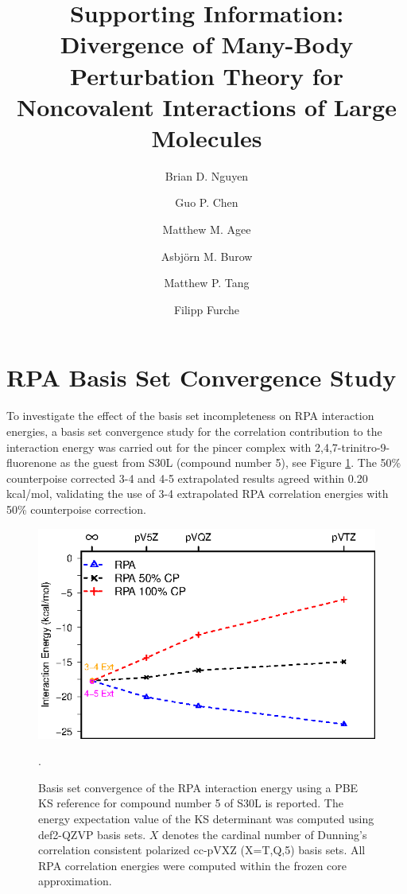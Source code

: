 \documentclass[journal=jctcce,manuscript=article]{achemso}
\author{Brian D. Nguyen}
\author{Guo P. Chen}
\author{Matthew M. Agee}
\author{Asbj{\"o}rn M. Burow}
\author{Matthew P. Tang}
\author{Filipp Furche}
\affiliation{Department of Chemistry, University of California, Irvine,
    1102 Natural Sciences II, Irvine, CA 92697-2025, USA}
\title{Supporting Information: Divergence of Many-Body Perturbation Theory
  for Noncovalent Interactions of Large Molecules}
\newcommand{\filipp}[1]{{\color{red} #1}}
\begin{document}
\maketitle

\tableofcontents
\newpage

\section{RPA Basis Set Convergence Study}

To investigate the effect of the basis set incompleteness on RPA interaction
energies, a basis set convergence study for the correlation contribution
to the interaction energy was carried out for the
pincer complex with 2,4,7-trinitro-9-fluorenone as the guest from
S30L (compound number 5)\cite{Sure15JChemTheoryComput}, see
Figure \ref{fig:extrapol}. The 50\% counterpoise corrected 3-4 and 4-5
extrapolated results agreed within 0.20 kcal/mol, validating the
use of 3-4 extrapolated RPA correlation energies with 50\% counterpoise
correction.

\begin{figure}[H]
  \centering
  \includegraphics{extrapol.eps}
  \caption{Basis set convergence of the RPA interaction energy using a
    PBE KS reference for compound number 5 of S30L\cite{Sure15JChemTheoryComput}
    is reported. The energy expectation value of the KS determinant was computed
    using def2-QZVP\cite{Weigend03JChemPhys119p12753} 
    basis sets. $X$ denotes the cardinal number of Dunning's correlation
    consistent polarized cc-pVXZ (X=T,Q,5) basis
    sets\cite{Dunning89JChemPhys90p1007,doi:10.1063/1.464303}. All RPA
    correlation energies were computed within the frozen core
    approximation.
     } \label{fig:extrapol}. 
\end{figure}
\end{document}
